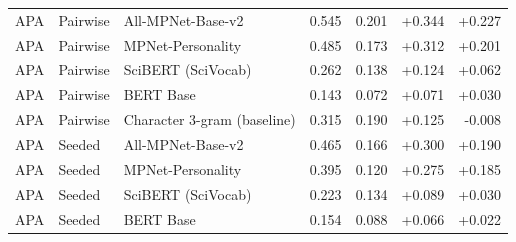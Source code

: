 \begin{table}[ht]
\begin{tabular}{lllrrrr}
APA & Pairwise & All-MPNet-Base-v2 & 0.545 & 0.201 & +0.344 & +0.227 \\
APA & Pairwise & MPNet-Personality & 0.485 & 0.173 & +0.312 & +0.201 \\
APA & Pairwise & SciBERT (SciVocab) & 0.262 & 0.138 & +0.124 & +0.062 \\
APA & Pairwise & BERT Base & 0.143 & 0.072 & +0.071 & +0.030 \\
APA & Pairwise & Character 3-gram (baseline) & 0.315 & 0.190 & +0.125 & -0.008 \\
APA & Seeded & All-MPNet-Base-v2 & 0.465 & 0.166 & +0.300 & +0.190 \\
APA & Seeded & MPNet-Personality & 0.395 & 0.120 & +0.275 & +0.185 \\
APA & Seeded & SciBERT (SciVocab) & 0.223 & 0.134 & +0.089 & +0.030 \\
APA & Seeded & BERT Base & 0.154 & 0.088 & +0.066 & +0.022 \\
\bottomrule
\end{tabular}
\end{table}
